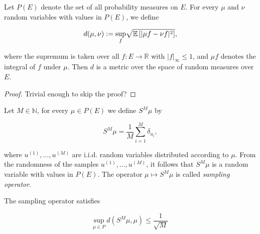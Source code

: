 \begin{lemma}
  Let $P(E)$ denote the set of all probability measures on $E$. For every $\mu$ and $\nu$ random variables with values in $P(E)$, we define

  \begin{equation*}
    d(\mu, \nu) := \underset{f}{\text{sup}} \sqrt{\mathbb{E}\left[|\mu f - \nu f|^2\right]},
  \end{equation*}

  where the supremum is taken over all $f : E \rightarrow \mathbb{R}$ with $|f|_\infty \le 1$, and $\mu f$ denotes the integral of $f$ under $\mu$. Then $d$ is a metric over the space of random measures over $E$.
\end{lemma}

\begin{proof} Trivial enough to skip the proof?
\end{proof}

\begin{definition}
  Let $M \in \mathbb{N}$, for every $\mu \in P(E)$ we define $S^M\mu$ by

  \begin{equation*}
    S^M\mu = \frac1{M}\sum_{i=1}^M\delta_{u_i},
  \end{equation*}

  where $u^{(1)}, \ldots, u^{(M)}$ are i.i.d. random variables distributed according to $\mu$. From the randomness of the samples $u^{(1)}, \ldots, u^{(M)}$, it follows that $S^M\mu$ is a random variable with values in $P(E)$. The operator $\mu \mapsto S^M\mu$ is called \textit{sampling operator}.
\end{definition}

\begin{lemma}\label{sampling-bound}
  The sampling operator satisfies

  \begin{equation*}
    \underset{\mu \in P}{\text{sup}}\ d(S^M\mu, \mu) \le \frac1{\sqrt{M}}
  \end{equation*}
\end{lemma}

